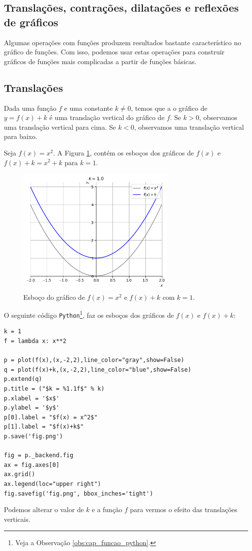 \subsection{Translações, contrações, dilatações e reflexões de gráficos}

Algumas operações com funções produzem resultados bastante característico no gráfico de funções. Com isso, podemos usar estas operações para construir gráficos de funções mais complicadas a partir de funções básicas.

\subsection{Translações}

Dada uma função $f$ e uma constante $k\neq 0$, temos que a o gráfico de $y = f(x) + k$ é uma translação vertical do gráfico de $f$. Se $k>0$, observamos uma translação vertical para cima. Se $k<0$, observamos uma translação vertical para baixo.

\begin{ex}
  Seja $f(x) = x^2$. A Figura \ref{fig:ex_trans_vert}, contém os esboços dos gráficos de $f(x)$ e $f(x)+k = x^2+k$ para $k=1$.

  \begin{figure}[H]
    \centering
    \includegraphics[width=0.7\textwidth]{./cap_funcao/dados/fig_ex_transvert/fig_ex_transvert}
    \caption{Esboço do gráfico de $f(x) = x^2$ e $f(x)+k$ com $k=1$.}
    \label{fig:ex_trans_vert}
  \end{figure}

  \ifispython
  O seguinte código \verb+Python+\footnote{Veja a Observação \ref{obs:cap_funcao_python}.}, faz os esboços dos gráficos de $f(x)$ e $f(x)+k$:
\begin{verbatim}
k = 1
f = lambda x: x**2

p = plot(f(x),(x,-2,2),line_color="gray",show=False)
q = plot(f(x)+k,(x,-2,2),line_color="blue",show=False)
p.extend(q)
p.title = ("$k = %1.1f$" % k)
p.xlabel = '$x$'
p.ylabel = '$y$'
p[0].label = "$f(x) = x^2$"
p[1].label = "$f(x)+k$"
p.save('fig.png')

fig = p._backend.fig
ax = fig.axes[0]
ax.grid()
ax.legend(loc="upper right")
fig.savefig('fig.png', bbox_inches='tight')
\end{verbatim}
  Podemos alterar o valor de $k$ e a função $f$ para vermos o efeito das translações verticais.
  \fi
\end{ex}


